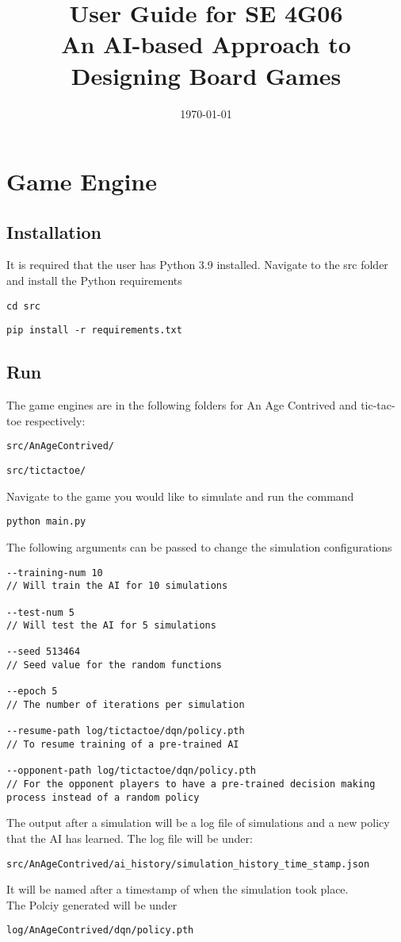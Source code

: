 \documentclass{article}
\title{User Guide for SE 4G06 \\ An AI-based Approach to Designing Board Games}
\author{\authname{}}
\date{\today}
\author{\authname}
\begin{document}
\maketitle

\section{Game Engine}
\subsection{Installation}
It is required that the user has Python 3.9 installed. 
Navigate to the src folder and install the Python requirements
\begin{lstlisting}
cd src
\end{lstlisting}
\begin{lstlisting}
pip install -r requirements.txt
\end{lstlisting}
\subsection{Run}
The game engines are in the following folders for An Age Contrived and tic-tac-toe respectively:
\begin{lstlisting}
src/AnAgeContrived/
\end{lstlisting}
\begin{lstlisting}
src/tictactoe/     
\end{lstlisting}
Navigate to the game you would like to simulate and run the command
\begin{lstlisting}
python main.py 
\end{lstlisting}
The following arguments can be passed to change the simulation configurations
\begin{lstlisting}
--training-num 10 
// Will train the AI for 10 simulations

--test-num 5 
// Will test the AI for 5 simulations

--seed 513464 
// Seed value for the random functions

--epoch 5
// The number of iterations per simulation

--resume-path log/tictactoe/dqn/policy.pth 
// To resume training of a pre-trained AI

--opponent-path log/tictactoe/dqn/policy.pth 
// For the opponent players to have a pre-trained decision making process instead of a random policy
\end{lstlisting}
The output after a simulation will be a log file of simulations and a new policy that the AI has learned. The log file will be under:
\begin{lstlisting}
src/AnAgeContrived/ai_history/simulation_history_time_stamp.json
\end{lstlisting}
It will be named after a timestamp of when the simulation took place. \\
The Polciy generated will be under 
\begin{lstlisting}
log/AnAgeContrived/dqn/policy.pth 
\end{lstlisting}
\end{document}
